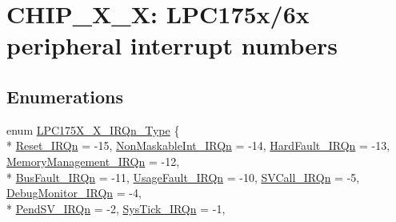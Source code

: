 \hypertarget{group___c_m_s_i_s__175_x__6_x___i_r_q}{\section{C\+H\+I\+P\+\_\+X\+\_\+X\+: L\+P\+C175x/6x peripheral interrupt numbers}
\label{group___c_m_s_i_s__175_x__6_x___i_r_q}
}
\subsection*{Enumerations}
\begin{DoxyCompactItemize}
\item 
enum \hyperlink{group___c_m_s_i_s__175_x__6_x___i_r_q_gaaaeafe7bd8401a46d55e8431b6326116}{L\+P\+C175\+X\+\_\+X\+\_\+\+I\+R\+Qn\+\_\+\+Type} \{ \\*
\hyperlink{group___c_m_s_i_s__175_x__6_x___i_r_q_ggaaaeafe7bd8401a46d55e8431b6326116a50ad21f2fd0d54d04b390d5a9145889a}{Reset\+\_\+\+I\+R\+Qn} = -\/15, 
\hyperlink{group___c_m_s_i_s__175_x__6_x___i_r_q_ggaaaeafe7bd8401a46d55e8431b6326116ade177d9c70c89e084093024b932a4e30}{Non\+Maskable\+Int\+\_\+\+I\+R\+Qn} = -\/14, 
\hyperlink{group___c_m_s_i_s__175_x__6_x___i_r_q_ggaaaeafe7bd8401a46d55e8431b6326116ab1a222a34a32f0ef5ac65e714efc1f85}{Hard\+Fault\+\_\+\+I\+R\+Qn} = -\/13, 
\hyperlink{group___c_m_s_i_s__175_x__6_x___i_r_q_ggaaaeafe7bd8401a46d55e8431b6326116a33ff1cf7098de65d61b6354fee6cd5aa}{Memory\+Management\+\_\+\+I\+R\+Qn} = -\/12, 
\\*
\hyperlink{group___c_m_s_i_s__175_x__6_x___i_r_q_ggaaaeafe7bd8401a46d55e8431b6326116a8693500eff174f16119e96234fee73af}{Bus\+Fault\+\_\+\+I\+R\+Qn} = -\/11, 
\hyperlink{group___c_m_s_i_s__175_x__6_x___i_r_q_ggaaaeafe7bd8401a46d55e8431b6326116a6895237c9443601ac832efa635dd8bbf}{Usage\+Fault\+\_\+\+I\+R\+Qn} = -\/10, 
\hyperlink{group___c_m_s_i_s__175_x__6_x___i_r_q_ggaaaeafe7bd8401a46d55e8431b6326116a4ce820b3cc6cf3a796b41aadc0cf1237}{S\+V\+Call\+\_\+\+I\+R\+Qn} = -\/5, 
\hyperlink{group___c_m_s_i_s__175_x__6_x___i_r_q_ggaaaeafe7bd8401a46d55e8431b6326116a8e033fcef7aed98a31c60a7de206722c}{Debug\+Monitor\+\_\+\+I\+R\+Qn} = -\/4, 
\\*
\hyperlink{group___c_m_s_i_s__175_x__6_x___i_r_q_ggaaaeafe7bd8401a46d55e8431b6326116a03c3cc89984928816d81793fc7bce4a2}{Pend\+S\+V\+\_\+\+I\+R\+Qn} = -\/2, 
\hyperlink{group___c_m_s_i_s__175_x__6_x___i_r_q_ggaaaeafe7bd8401a46d55e8431b6326116a6dbff8f8543325f3474cbae2446776e7}{Sys\+Tick\+\_\+\+I\+R\+Qn} = -\/1, 

\end{DoxyCompactItemize}
